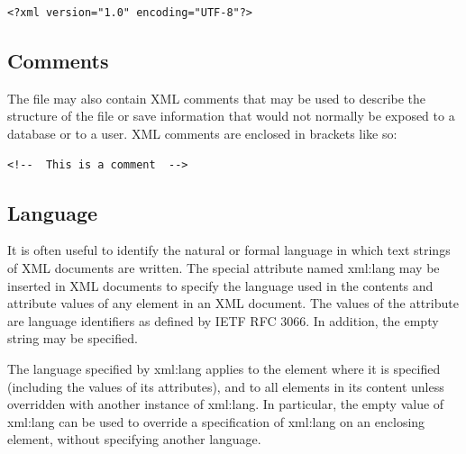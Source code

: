 \lstset{frame=none}
\begin{lstlisting}
<?xml version="1.0" encoding="UTF-8"?>
\end{lstlisting}

\subsection{Comments}
The file may also contain XML comments that may be used to describe the structure of the file or save information that would not normally be exposed to a database or to a user. XML comments are enclosed in brackets like so:

\begin{lstlisting}
<!--  This is a comment  -->
\end{lstlisting}
\lstset{frame=single}

\subsection{Language}
It is often useful to identify the natural or formal language in which text strings of XML documents are written.  The special attribute named xml:lang may be inserted in XML documents to specify the language used in the contents and attribute values of any element in an XML document. The values of the attribute are language identifiers as defined by IETF RFC 3066. In addition, the empty string may be specified.

The language specified by xml:lang applies to the element where it is specified (including the values of its attributes), and to all elements in its content unless overridden with another instance of xml:lang. In particular, the empty value of xml:lang can be used to override a specification of xml:lang on an enclosing element, without specifying another language.

